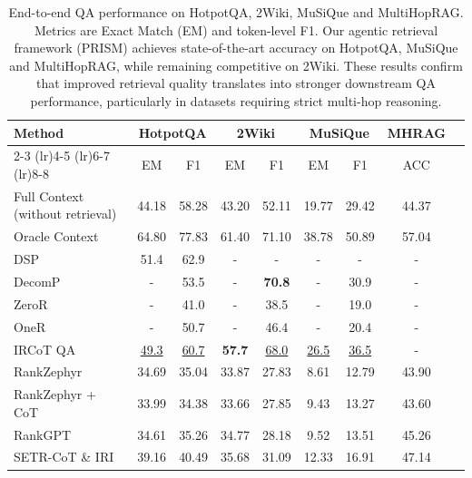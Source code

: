 \documentclass{article} %
\begin{document}
\begin{table}[ht]
\centering
\small
\setlength{\tabcolsep}{5pt} %
\caption{End-to-end QA performance on HotpotQA, 2Wiki, MuSiQue and MultiHopRAG. Metrics are Exact Match (EM) and token-level F1. Our agentic retrieval framework (PRISM) achieves state-of-the-art accuracy on HotpotQA, MuSiQue and MultiHopRAG, while remaining competitive on 2Wiki. These results confirm that improved retrieval quality translates into stronger downstream QA performance, particularly in datasets requiring strict multi-hop reasoning.}

\begin{tabular}{l|cc|cc|cc|cc}
\toprule
\multirow{2}{*}{\textbf{Method}} & \multicolumn{2}{c|}{\textbf{HotpotQA}} & \multicolumn{2}{c|}{\textbf{2Wiki}} & \multicolumn{2}{c|}{\textbf{MuSiQue}} & \multicolumn{1}{c}{\textbf{MHRAG}} \\
\cmidrule(lr){2-3} \cmidrule(lr){4-5} \cmidrule(lr){6-7} \cmidrule(lr){8-8}
 & EM & F1 & EM & F1 & EM & F1 & ACC \\
\midrule

Full Context (without retrieval) & 44.18 & 58.28 & 43.20 & 52.11 & 19.77 & 29.42 & 44.37 \\
Oracle Context & 64.80 & 77.83 & 61.40 & 71.10 & 38.78 & 50.89 & 57.04 \\
\midrule
DSP \citep{khattab2022demonstrate} &  51.4  & 62.9  & - & - & - & - & - \\
DecomP \citep{khotdecomposed} &  -  & 53.5  & - & \textbf{70.8} & - & 30.9 & - \\
ZeroR \citep{trivedi-etal-2023-interleaving} &  -  & 41.0 & - & 38.5 & - & 19.0 & - \\
OneR \citep{trivedi-etal-2023-interleaving} &  -   & 50.7  & - & 46.4 & - & 20.4 & - \\
IRCoT QA \citep{trivedi-etal-2023-interleaving} & \underline{49.3}  & \underline{60.7}  & \textbf{57.7} & \underline{68.0}  & \underline{26.5} & \underline{36.5}  & - \\

RankZephyr \citep{pradeep2023rankzephyr} & 34.69 & 35.04 & 33.87 & 27.83 & 8.61 & 12.79 & 43.90 \\ 
RankZephyr + CoT  \citep{pradeep2023rankzephyr} & 33.99 & 34.38 & 33.66 & 27.85 & 9.43 & 13.27 & 43.60 \\ 

RankGPT \citep{sun-etal-2023-chatgpt, lee-etal-2025-shifting} & 34.61 & 35.26 & 34.77 & 28.18 & 9.52 & 13.51 & 45.26 \\
SETR-CoT \& IRI \citep{lee-etal-2025-shifting}  & 39.16 & 40.49 & 35.68 & 31.09 & 12.33 & 16.91 & 47.14 \\


\end{tabular}
\end{table}
\end{document}
